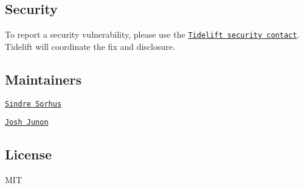 \subsection*{Security}

To report a security vulnerability, please use the \href{https://tidelift.com/security}{\tt Tidelift security contact}. Tidelift will coordinate the fix and disclosure.

\subsection*{Maintainers}


\begin{DoxyItemize}
\item \href{https://github.com/sindresorhus}{\tt Sindre Sorhus}
\item \href{https://github.com/qix-}{\tt Josh Junon}
\end{DoxyItemize}

\subsection*{License}

M\+IT 